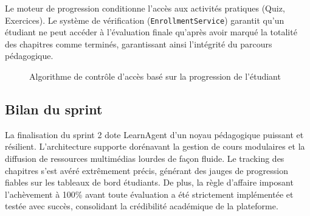 \documentclass[12pt,a4paper]{report}
\begin{document}
Le moteur de progression conditionne l'accès aux activités pratiques (Quiz, Exercices). Le système de vérification (\texttt{EnrollmentService}) garantit qu'un étudiant ne peut accéder à l'évaluation finale qu'après avoir marqué la totalité des chapitres comme terminés, garantissant ainsi l'intégrité du parcours pédagogique.

\begin{figure}[H]
\centering
{}
\caption{Algorithme de contrôle d’accès basé sur la progression de l'étudiant}
\end{figure}

\subsection{Bilan du sprint}

La finalisation du sprint 2 dote LearnAgent d'un noyau pédagogique puissant et résilient. L'architecture supporte dorénavant la gestion de cours modulaires et la diffusion de ressources multimédias lourdes de façon fluide. Le tracking des chapitres s'est avéré extrêmement précis, générant des jauges de progression fiables sur les tableaux de bord étudiants. De plus, la règle d'affaire imposant l'achèvement à 100\% avant toute évaluation a été strictement implémentée et testée avec succès, consolidant la crédibilité académique de la plateforme.
\end{document}
